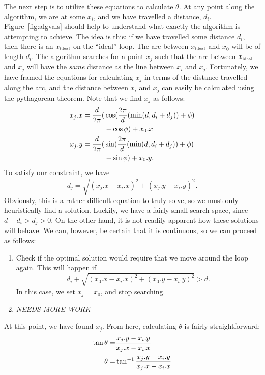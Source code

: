 \documentclass[twocolumn,11pt]{article}
\begin{document}
The next step is to utilize these equations to calculate $\theta$. At any point
along the algorithm, we are at some $x_i$, and we have travelled a distance,
$d_i$. Figure~\ref{fig:algvals} should help to understand what exactly the
algorithm is attempting to achieve. The idea is this: if we have travelled some
distance $d_i$, then there is an $x_{\mbox{{\tiny ideal}}}$ on the ``ideal''
loop. The arc between $x_{\mbox{{\tiny ideal}}}$ and $x_0$ will be of length
$d_i$. The algorithm searches for a point $x_j$ such that the arc between
$x_{\mbox{{\tiny ideal}}}$ and $x_j$ will have the \emph{same} distance as the
line between $x_i$ and $x_j$. Fortunately, we have framed the equations for
calculating $x_j$ in terms of the distance travelled along the arc, and the
distance between $x_i$ and $x_j$ can easily be calculated using the pythagorean
theorem. Note that we find $x_j$ as follows:
\begin{align}
  x_j.x = \frac{d}{2\pi} ( & \cos( \frac{ 2 \pi }{ d } ( \min( d, d_i + d_j ) )
                                  + \phi ) \notag \\ & - \cos \phi ) + x_0.x
                                  \label{eq:xjx} \\
  x_j.y = \frac{d}{2\pi} ( & \sin( \frac{ 2 \pi }{ d } ( \min( d, d_i + d_j ) )
                                  + \phi ) \notag \\ & - \sin \phi ) + x_0.y.
                                  \label{eq:xjy}
\end{align}
To satisfy our constraint, we have
\begin{equation}
  d_j = \sqrt{ ( x_j.x - x_i.x )^2 + ( x_j.y - x_i.y )^2 }. \label{eq:dists}
\end{equation}
Obviously, this is a rather difficult equation to truly solve, so we must only
heuristically find a solution. Luckily, we
have a fairly small search space, since $d - d_i > d_j > 0$. On the other hand,
it is not readily apparent how these solutions will behave. We can, however,
be certain that it is continuous, so we can proceed as follows:
\begin{enumerate}
\item Check if the optimal solution would require that we move around the loop
  again. This will happen if
  \[d_i+\sqrt{(x_0.x-x_i.x)^2+(x_0.y-x_i.y)^2} > d.\]
  In this case, we set $x_j = x_0$, and stop searching.
\item \emph{NEEDS MORE WORK}
\end{enumerate}

At this point, we have found $x_j$. From here, calculating $\theta$ is fairly
straightforward:
\begin{align}
  \tan \theta = & \frac{x_j.y - x_i.y}{x_j.x-x_i.x} \notag \\
  \theta = & \tan^{-1} \frac{x_j.y - x_i.y}{x_j.x-x_i.x} \label{eq:theta}
\end{align}
\end{document}
